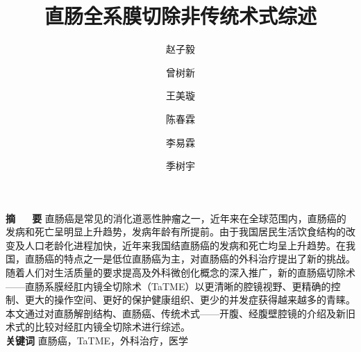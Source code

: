 \documentclass[a4paper,11pt,onecolumn,twoside]{article}
\begin{document}
\title{\huge{直肠全系膜切除非传统术式综述}}

\author[]{赵子毅}{}
\author[]{曾树新}{}
\author[]{王美璇}{}
\author[]{陈春霖}{}
\author[]{李易霖}{}
\author[]{季树宇}{}



\renewcommand\Authands{ 和~ }


\date{}



\pagestyle{fancy}
\fancyhf{}
\headheight 26.70523pt
\fancyhead[RE,RO]{\thepage}
\lfoot{}
\cfoot{}
\rfoot{}

\newenvironment{figurehere}
{\def\@captype{figure}}
{}
\makeatother

\maketitle

\newcommand{\supercite}[1]{\textsuperscript{\cite{#1}}}


\setlength{\oddsidemargin}{1cm}  %
\setlength{\evensidemargin}{\oddsidemargin}
\setlength{\textwidth}{13.50cm}
\vspace{-.8cm}
\begin{center}
    \parbox{\textwidth}{
        \textbf{摘~~~要} \quad  直肠癌是常见的消化道恶性肿瘤之一，近年来在全球范围内，直肠癌的发病和死亡呈明显上升趋势，发病年龄有所提前。由于我国居民生活饮食结构的改变及人口老龄化进程加快，近年来我国结直肠癌的发病和死亡均呈上升趋势。在我国，直肠癌的特点之一是低位直肠癌为主，对直肠癌的外科治疗提出了新的挑战。随着人们对生活质量的要求提高及外科微创化概念的深入推广，新的直肠癌切除术——直肠系膜经肛内镜全切除术（TaTME）以更清晰的腔镜视野、更精确的控制、更大的操作空间、更好的保护健康组织、更少的并发症获得越来越多的青睐。本文通过对直肠解剖结构、直肠癌、传统术式——开腹、经腹壁腔镜的介绍及新旧术式的比较对经肛内镜全切除术进行综述。
        \\
        \textbf{关键词} \quad 直肠癌，TaTME，外科治疗，医学}
\end{center}
\end{document}
